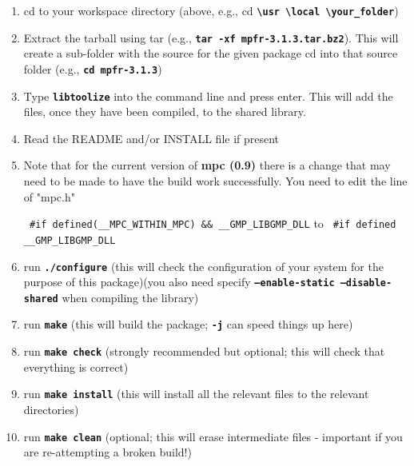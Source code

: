 \begin{enumerate}

\item cd to your workspace directory (above, e.g., cd \textbf{\texttt{\textbackslash{usr} \textbackslash{local} \textbackslash{your\_folder}}})
\item Extract the tarball using tar (e.g., \textbf{\texttt{tar -xf mpfr-3.1.3.tar.bz2}}). This will create a sub-folder with the source for the given package
cd into that source folder (e.g., \textbf{\texttt{cd mpfr-3.1.3}})
\item Type \textbf{\texttt{libtoolize}} into the command line and press enter. This will add the files, once they have been compiled, to the shared library.
\item Read the README and/or INSTALL file if present
\item Note that for the current version of \textbf{mpc (0.9)} there is a change that may need to be made to have the build work successfully. You need to edit the line of "mpc.h"

\begin{minipage}{0.9\linewidth}
\centering
    \begingroup
    \texttt{%
    \#if defined(\_\_MPC\_WITHIN\_MPC) \&\& \_\_GMP\_LIBGMP\_DLL}
    to
    \texttt{%
    \#if defined \_\_GMP\_LIBGMP\_DLL}
    \endgroup
\end{minipage}

\item run \textbf{\texttt{./configure}} (this will check the configuration of your system for the purpose of this package)(you also need specify \textbf{\texttt{--enable-static --disable-shared}} when compiling the library)
\item run \textbf{\texttt{make}} (this will build the package; \textbf{\texttt{-j}} can speed things up here)
\item run \textbf{\texttt{make check}} (strongly recommended but optional; this will check that everything is correct)
\item run \textbf{\texttt{make install}} (this will install all the relevant files to the relevant directories)
\item run \textbf{\texttt{make clean}} (optional; this will erase intermediate files - important if you are re-attempting a broken build!)

\end{enumerate}









